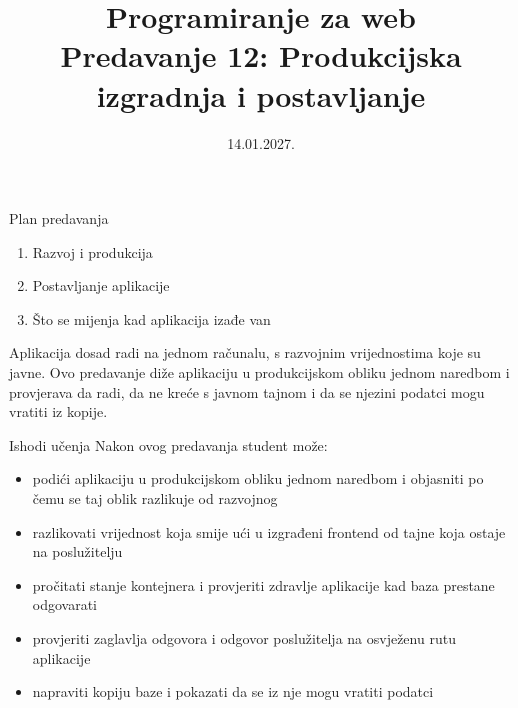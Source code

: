 

\title[Predavanje 12: Produkcija]{Programiranje za web \\ Predavanje 12: Produkcijska izgradnja i postavljanje}
\date{14.01.2027.}



\frame{\titlepage}

\begin{frame}{Plan predavanja}
\begin{enumerate}
  \item Razvoj i produkcija
  \item Postavljanje aplikacije
  \item Što se mijenja kad aplikacija izađe van
\end{enumerate}

\vspace{0.6em}
Aplikacija dosad radi na jednom računalu, s razvojnim vrijednostima koje su javne. Ovo predavanje diže aplikaciju u produkcijskom obliku jednom naredbom i provjerava da radi, da ne kreće s javnom tajnom i da se njezini podatci mogu vratiti iz kopije.
\end{frame}

\begin{frame}{Ishodi učenja}
Nakon ovog predavanja student može:

\begin{itemize}
  \itemsep0.3em
  \item podići aplikaciju u produkcijskom obliku jednom naredbom i objasniti po čemu se taj oblik razlikuje od razvojnog
  \item razlikovati vrijednost koja smije ući u izgrađeni frontend od tajne koja ostaje na poslužitelju
  \item pročitati stanje kontejnera i provjeriti zdravlje aplikacije kad baza prestane odgovarati
  \item provjeriti zaglavlja odgovora i odgovor poslužitelja na osvježenu rutu aplikacije
  \item napraviti kopiju baze i pokazati da se iz nje mogu vratiti podatci
\end{itemize}
\end{frame}

